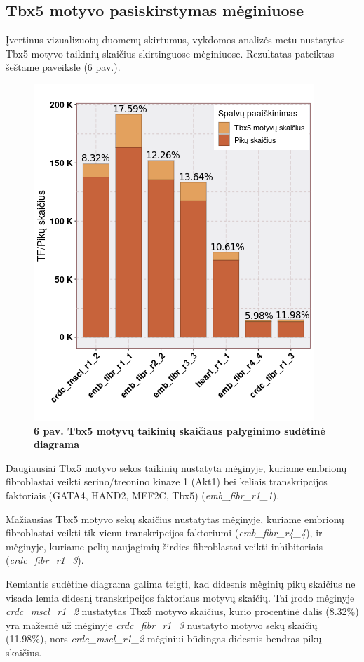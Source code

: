 \documentclass[12pt]{article}
\begin{document}

\subsection{Tbx5 motyvo pasiskirstymas mėginiuose}
Įvertinus vizualizuotų duomenų skirtumus, vykdomos analizės metu nustatytas
Tbx5 motyvo taikinių skaičius skirtinguose mėginiuose. Rezultatas pateiktas
šeštame paveiksle (6 pav.).

\begin{figure}[htb]
    \begin{center}
        \includegraphics[width=0.5\linewidth]{../Figures/tf_hit_percentage.png}
        \vspace{-2\baselineskip}
        \caption*{\small\textbf{6 pav. Tbx5 motyvų taikinių skaičiaus palyginimo
                                sudėtinė diagrama}}
    \end{center}
\end{figure}

Daugiausiai Tbx5 motyvo sekos taikinių nustatyta mėginyje,
kuriame embrionų fibroblastai veikti serino/treonino kinaze 1 (Akt1) bei
keliais transkripcijos faktoriais (GATA4, HAND2, MEF2C, Tbx5)
(\small\emph{emb\_fibr\_r1\_1}).

Mažiausias Tbx5 motyvo sekų skaičius nustatytas mėginyje, kuriame embrionų
fibroblastai veikti tik vienu transkripcijos faktoriumi
(\small\emph{emb\_fibr\_r4\_4}), ir mėginyje, kuriame pelių naujagimių
širdies fibroblastai veikti inhibitoriais
(\small\emph{crdc\_fibr\_r1\_3}).

Remiantis sudėtine diagrama galima teigti, kad didesnis mėginių pikų skaičius
ne visada lemia didesnį transkripcijos faktoriaus motyvų skaičių. Tai įrodo
mėginyje \small\emph{crdc\_mscl\_r1\_2} nustatytas Tbx5 motyvo skaičius,
kurio procentinė dalis (8.32\%) yra mažesnė už mėginyje
\small\emph{crdc\_fibr\_r1\_3} nustatyto motyvo sekų skaičių (11.98\%),
nors \small\emph{crdc\_mscl\_r1\_2} mėginiui būdingas didesnis bendras pikų
skaičius.
\end{document}
